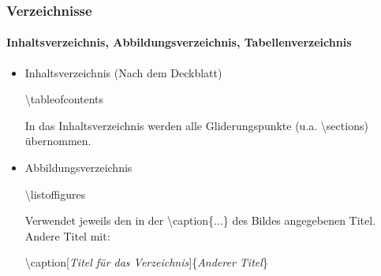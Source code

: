 
\begin{frame}
\frametitle{Verzeichnisse}
\framesubtitle{Inhaltsverzeichnis, Abbildungsverzeichnis, Tabellenverzeichnis}
\begin{itemize}


\item Inhaltsverzeichnis (Nach dem Deckblatt)\\
\medskip
\begin{ttfamily}{\normalsize
\color{nounibaredI}\textbackslash tableofcontents\\}
\end{ttfamily}
\medskip
In das Inhaltsverzeichnis werden alle Gliderungspunkte (u.a. \color{unibablueI} \textbackslash section\color{black}s) übernommen.\\
\medskip

\item Abbildungsverzeichnis\\
\medskip
\begin{ttfamily}{\normalsize
\color{nounibaredI}\textbackslash listoffigures\\}
\end{ttfamily}
\medskip
Verwendet jeweils den in der {\ttfamily \color{nounibaredI}\textbackslash caption\color{black}\{...\}} des Bildes angegebenen Titel. 
Andere Titel mit:\\ 
\begin{ttfamily}{\normalsize
\color{nounibaredI} \textbackslash caption\color{nounibagreenI}[\textit{Titel für das Verzeichnis}]\color{black}\{\textit{Anderer Titel}\}\\}
\end{ttfamily}
\medskip


\end{itemize}
\end{frame}
